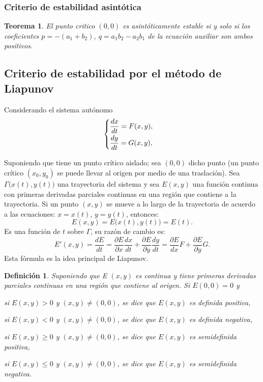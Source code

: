 \documentclass[a5paper,doc,10pt,noapacite]{apa6}
\newtheorem{definicion}{Definición}
\newtheorem{teorema}{Teorema}
\begin{document}
{{%
\subsubsection{Criterio de estabilidad asintótica}

\begin{teorema}
	El punto critico \((0,0)\) es asintóticamente estable si y solo si  los coeficientes \(p=-(a_1+b_2)\), \(q=a_1b_2-a_2b_1\) de la ecuación auxiliar son ambos positivos.
\end{teorema}


%
%
%
\subsection{Criterio de estabilidad por el método de Liapunov}
%
%
%
Considerando el sistema autónomo
\begin{equation}\label{m-9}
	\begin{cases}
		\dfrac{dx}{dt}=F(x,y) ,\vspace{0.3em}
		\\
		\dfrac{dy}{dt}=G(x,y),
	\end{cases}
\end{equation}

Suponiendo que tiene un punto crítico aislado; sea \((0,0)\) dicho punto (un punto crítico \(( x_0 , y_0 )\) se puede
llevar al origen por medio de una traslación). Sea \(\Gamma\big(x(t),y(t)\big)\) una trayectoria del sistema y sea \(E( x , y )\) una función continua con primeras derivadas parciales continuas en una región que contiene a la trayectoria. Si un punto \(( x, y )\) se mueve a lo largo de la trayectoria de acuerdo a las ecuaciones: \(x = x ( t )\), \(y = y ( t )\), entonces: 
\[
	E(x,y)=E\big(x(t),y(t)\big)=E(t).
\]
Es una función de \(t\) sobre \(\Gamma\), su razón de cambio es:
\begin{equation}\label{m-10}
	E'(x,y)=\dfrac{dE}{dt}=\dfrac{\partial E}{\partial x}\dfrac{dx}{dt}+\dfrac{\partial E}{\partial y}\dfrac{dy}{dt}=\dfrac{\partial E}{dx}F+\dfrac{\partial E}{\partial y}G.
\end{equation}
Esta fórmula es la idea principal de Liapunov.

\begin{definicion}
	Suponiendo que E \(( x , y )\) es continua y tiene primeras derivadas parciales continuas en una región que contiene al origen. Si \(E ( 0 , 0 ) = 0\) y
	\begin{APAenumerate}
		\item si \(E(x,y)>0\) y \((x,y)\neq(0,0)\), se dice que \(E(x,y)\) es definida positiva,
		\item si \(E(x,y)<0\) y \((x,y)\neq(0,0)\), se dice que \(E(x,y)\) es definida negativa,
		\item si \(E(x,y)\geq 0\) y \((x,y)\neq(0,0)\), se dice que \(E(x,y)\) es semidefinida positiva,
		\item si \(E(x,y)\leq 0\) y \((x,y)\neq(0,0)\), se dice que \(E(x,y)\) es semidefinida negativa.
	\end{APAenumerate}
\end{definicion}

}}
\end{document}
